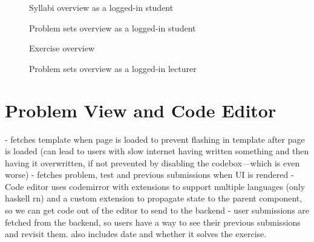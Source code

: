 \begin{figure}[H]
    \centering
    \caption{Syllabi overview as a logged-in student}
    \label{fig:syllabi}
\end{figure}

\begin{figure}[H]
    \centering
    \caption{Problem sets overview as a logged-in student}
    \label{fig:problemsets}
\end{figure}

\begin{figure}[H]
    \centering
    \caption{Exercise overview}
    \label{fig:exercise_overview}
\end{figure}

\begin{figure}[H]
    \centering
    \caption{Problem sets overview as a logged-in lecturer}
    \label{fig:problemsets_teacher_view}
\end{figure}

\section{Problem View and Code Editor}
- fetches template when page is loaded to prevent flashing in template after page is loaded (can lead to users with slow internet having written something and then having it overwritten, if not prevented by disabling the codebox---which is even worse)
- fetches problem, test and previous submissions when UI is rendered
- Code editor uses codemirror with extensions to support multiple languages (only haskell rn) and a custom extension to propagate state to the parent component, so we can get code out of the editor to send to the backend
- user submissions are fetched from the backend, so users have a way to see their previous submissions and revisit them. also includes date and whether it solves the exercise.


